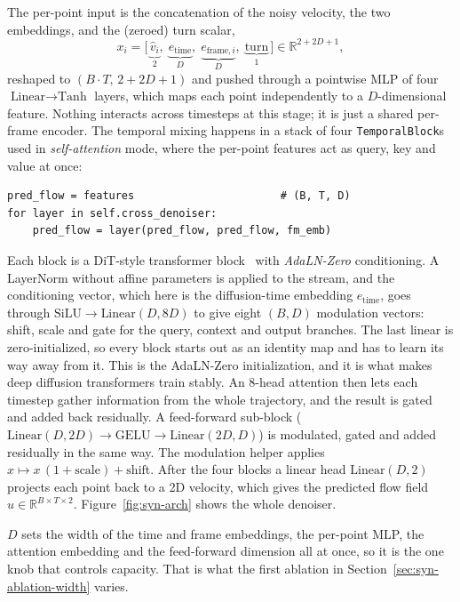 The per-point input is the concatenation of the noisy velocity, the two
embeddings, and the (zeroed) turn scalar,
\begin{equation}
x_i = \big[\,\underbrace{\hat v_i}_{2},\;
\underbrace{e_{\text{time}}}_{D},\;
\underbrace{e_{\text{frame},i}}_{D},\;
\underbrace{\text{turn}}_{1}\,\big]\in\mathbb{R}^{2+2D+1},
\label{eq:syn-input}
\end{equation}
reshaped to $(B\cdot T,\,2+2D+1)$ and pushed through a pointwise MLP of four
$\text{Linear}\to\text{Tanh}$ layers, which maps each point independently to a
$D$-dimensional feature. Nothing interacts across timesteps at this stage; it is
just a shared per-frame encoder. The temporal mixing happens in a stack of four
\texttt{TemporalBlock}s used in \emph{self-attention} mode, where the per-point
features act as query, key and value at once:
\begin{lstlisting}
pred_flow = features                       # (B, T, D)
for layer in self.cross_denoiser:
    pred_flow = layer(pred_flow, pred_flow, fm_emb)
\end{lstlisting}
Each block is a DiT-style transformer block~\cite{dit} with \emph{AdaLN-Zero}
conditioning. A LayerNorm without affine parameters is applied to the stream, and
the conditioning vector, which here is the diffusion-time embedding
$e_{\text{time}}$, goes through $\text{SiLU}\to\text{Linear}(D,8D)$ to give eight
$(B,D)$ modulation vectors: shift, scale and gate for the query, context and
output branches. The last linear is zero-initialized, so every block starts out
as an identity map and has to learn its way away from it. This is the AdaLN-Zero
initialization, and it is what makes deep diffusion transformers train stably.
An 8-head attention then lets each timestep gather information from the whole
trajectory, and the result is gated and added back residually. A feed-forward
sub-block ($\text{Linear}(D,2D)\to\text{GELU}\to\text{Linear}(2D,D)$) is
modulated, gated and added residually in the same way. The modulation helper
applies $x\mapsto x\,(1+\text{scale})+\text{shift}$. After the four blocks a
linear head $\text{Linear}(D,2)$ projects each point back to a 2D velocity, which
gives the predicted flow field $\hat u\in\mathbb{R}^{B\times T\times 2}$.
Figure~\ref{fig:syn-arch} shows the whole denoiser.

$D$ sets the width of the time and frame embeddings, the per-point MLP, the
attention embedding and the feed-forward dimension all at once, so it is the one
knob that controls capacity. That is what the first ablation in
Section~\ref{sec:syn-ablation-width} varies.

